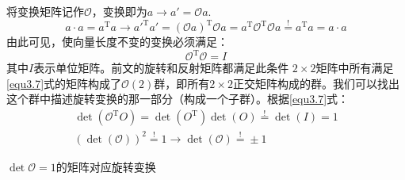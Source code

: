 将变换矩阵记作$\mathcal{O}$，变换即为$a \rightarrow a' = \mathcal{O}a$.
\begin{equation}
\label{equ3.6}
a \cdot a = a^{\mathrm{T}} a \rightarrow a'^{\mathrm{T}} a' = (\mathcal{O} a)^{\mathrm{T}} \mathcal{O} a = a^{\mathrm{T}} \mathcal{O}^{\mathrm{T}} \mathcal{O} a \stackrel{!}{=} a^{\mathrm{T}} a = a \cdot a
\end{equation}
由此可见，使向量长度不变的变换必须满足：
\begin{equation}
\label{equ3.7}
\mathcal{O}^{\mathrm{T}} \mathcal{O} = I
\end{equation}
其中$I$表示单位矩阵。前文的旋转和反射矩阵都满足此条件%
$2 \times 2$矩阵中所有满足\ref{equ3.7}式的矩阵构成了$\mathcal{O}(2)$群，即所有$2 \times 2$正交矩阵构成的群。我们可以找出这个群中描述旋转变换的那一部分（构成一个子群）。根据\ref{equ3.7}式：
\begin{align}
\det(\mathcal{O}^{\mathrm{T}} O ) = \det(O^{\mathrm{T}}) \det(O) \stackrel{!}{=} \det(I) = 1 \nonumber\\
\label{equ3.8}
(\det(\mathcal{O}))^2 \stackrel{!}{=} 1 \rightarrow \det{(\mathcal{O})} \stackrel{!}{=} \pm 1
\end{align}

$\det \mathcal{O} = 1$的矩阵对应旋转变换

